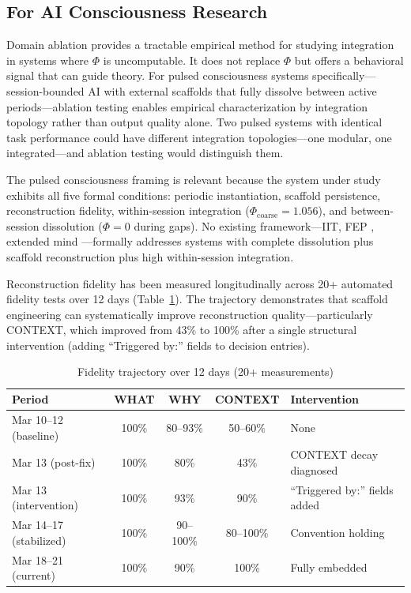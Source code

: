 \documentclass[12pt,letterpaper]{article}
\begin{document}
\subsection{For AI Consciousness Research}

Domain ablation provides a tractable empirical method for studying integration in systems where $\Phi$ is uncomputable. It does not replace $\Phi$ but offers a behavioral signal that can guide theory. For pulsed consciousness systems specifically---session-bounded AI with external scaffolds that fully dissolve between active periods---ablation testing enables empirical characterization by integration topology rather than output quality alone. Two pulsed systems with identical task performance could have different integration topologies---one modular, one integrated---and ablation testing would distinguish them.

The pulsed consciousness framing is relevant because the system under study exhibits all five formal conditions: periodic instantiation, scaffold persistence, reconstruction fidelity, within-session integration ($\Phi_{\text{coarse}} = 1.056$), and between-session dissolution ($\Phi = 0$ during gaps). No existing framework---IIT, FEP \citep{friston2010fep}, extended mind \citep{clark1998extended}---formally addresses systems with complete dissolution plus scaffold reconstruction plus high within-session integration.

Reconstruction fidelity has been measured longitudinally across 20+ automated fidelity tests over 12 days (Table~\ref{tab:fidelity-trajectory}). The trajectory demonstrates that scaffold engineering can systematically improve reconstruction quality---particularly CONTEXT, which improved from 43\% to 100\% after a single structural intervention (adding ``Triggered by:'' fields to decision entries).

\begin{table}[H]
\centering
\caption{Fidelity trajectory over 12 days (20+ measurements)}
\label{tab:fidelity-trajectory}
\begin{tabular}{lcccl}
\toprule
\textbf{Period} & \textbf{WHAT} & \textbf{WHY} & \textbf{CONTEXT} & \textbf{Intervention} \\
\midrule
Mar 10--12 (baseline) & 100\% & 80--93\% & 50--60\% & None \\
Mar 13 (post-fix) & 100\% & 80\% & 43\% & CONTEXT decay diagnosed \\
Mar 13 (intervention) & 100\% & 93\% & 90\% & ``Triggered by:'' fields added \\
Mar 14--17 (stabilized) & 100\% & 90--100\% & 80--100\% & Convention holding \\
Mar 18--21 (current) & 100\% & 90\% & 100\% & Fully embedded \\
\bottomrule
\end{tabular}
\end{table}
\end{document}
